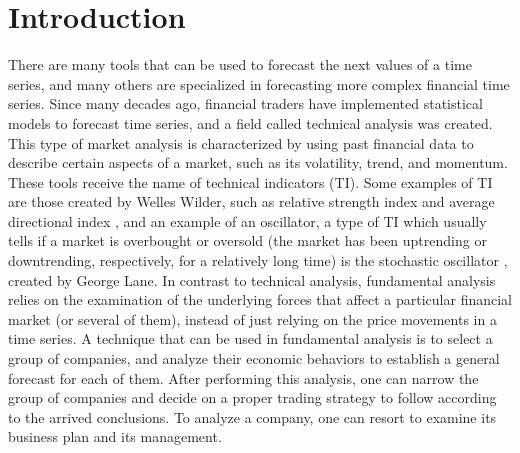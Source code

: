 \documentclass[12pt,journal,compsoc]{IEEEtran}
\begin{document}
\section{Introduction}
\label{introduction}

There are many tools that can be used to forecast the next values of a time series, and many others are specialized in forecasting more complex financial time series. Since many decades ago, financial traders have implemented statistical models to forecast time series, and a field called technical analysis was created. This type of market analysis is characterized by using past financial data to describe certain aspects of a market, such as its volatility, trend, and momentum. These tools receive the name of technical indicators (TI). Some examples of TI are those created by Welles Wilder, such as relative strength index and average directional index \cite{wilder1978new}, and an example of an oscillator, a type of TI which usually tells if a market is overbought or oversold (the market has been uptrending or downtrending, respectively, for a relatively long time) is the stochastic oscillator \cite{schirding1984stochastic}, created by George Lane. In contrast to technical analysis, fundamental analysis relies on the examination of the underlying forces that affect a particular financial market (or several of them), instead of just relying on the price movements in a time series. A technique that can be used in fundamental analysis is to select a group of companies, and analyze their economic behaviors to establish a general forecast for each of them. After performing this analysis, one can narrow the group of companies and decide on a proper trading strategy to follow according to the arrived conclusions. To analyze a company, one can resort to examine its business plan and its management.
\end{document}
